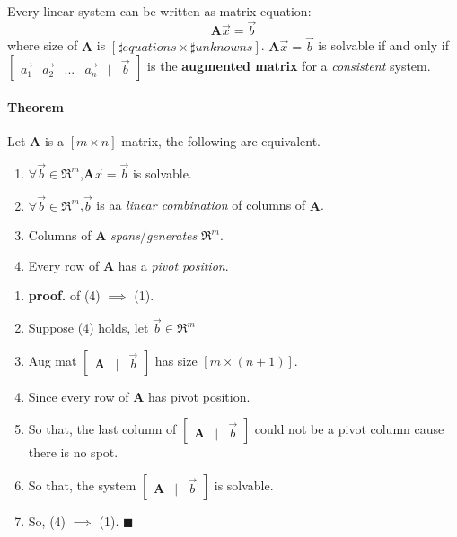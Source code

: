 \documentclass{article}
\begin{document}
	\paragraph{} Every linear system can be written as matrix equation:
	\[
	\textbf{A} \vec{x} = \vec{b}
	\]
	where size of $\textbf{A}$ is $[\sharp equations \times \sharp unknowns]$.
	\newline $\textbf{A}\vec{x}=\vec{b}$ is solvable if and only if $\begin{bmatrix}\vec{a_1}&\vec{a_2}&...&\vec{a_n}&\vert&\vec{b}\end{bmatrix}$ is the \textbf{augmented matrix} for a \emph{consistent} system.
	\paragraph{Theorem} Let $\textbf{A}$ is a $[m \times n]$ matrix, the following are equivalent.
	\begin{enumerate}
		\item $\forall \vec{b} \in \Re^m$,$\textbf{A} \vec{x} = \vec{b}$ is solvable.
		\item $\forall \vec{b} \in \Re^m$,$\vec{b}$ is aa \emph{linear combination} of columns of $\textbf{A}$.
		\item Columns of $\textbf{A}$ \emph{spans}/\emph{generates} $\Re^m$.
		\item Every row of $\textbf{A}$ has a \emph{pivot position}.
	\end{enumerate}
	\quad \newline
	\begin{enumerate}
		\item \textbf{proof.} of (4) $\implies$ (1).
		\item \quad Suppose (4) holds, let $\vec{b} \in \Re^m$
		\item \quad Aug mat $\begin{bmatrix}\textbf{A}&\vert&\vec{b}\end{bmatrix}$ has size $[m \times (n+1)]$.
		\item Since every row of $\textbf{A}$ has pivot position.
		\item So that, the last column of $\begin{bmatrix}\textbf{A}&\vert&\vec{b}\end{bmatrix}$ could not be a pivot column cause there is no spot.
		\item So that, the system $\begin{bmatrix}\textbf{A}&\vert&\vec{b}\end{bmatrix}$ is solvable.
		\item So, (4) $\implies$ (1). $\blacksquare$
	\end{enumerate}
\end{document}
